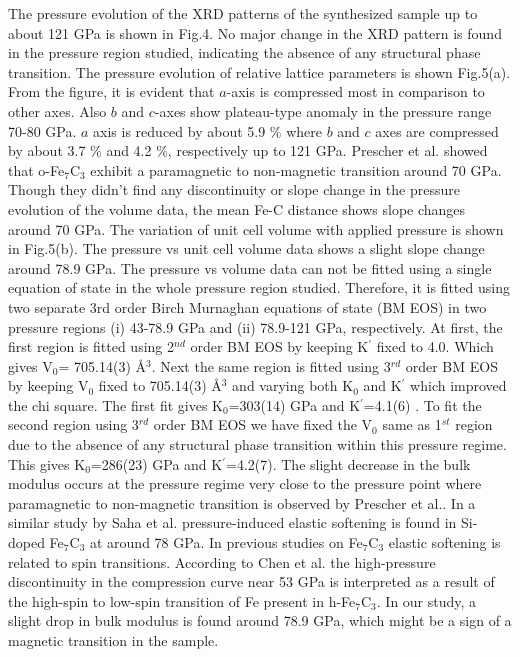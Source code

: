 \documentclass[prb,aps,preprint]{revtex4-2}
\begin{document}
The pressure evolution of the XRD patterns of the synthesized sample  up to about 121 GPa is shown in Fig.4. No major change in the XRD pattern is found in the pressure region studied, indicating the absence of any structural phase transition. 
The pressure evolution of relative lattice parameters is shown Fig.5(a).
From the figure, it is evident that $a$-axis is compressed most in comparison to other axes. Also $b$ and $c$-axes show plateau-type anomaly in the pressure range 70-80 GPa. $a$ axis is reduced by about 5.9 \% where $b$ and $c$ axes are compressed by about 3.7 \% and 4.2 \%, respectively up to 121 GPa. Prescher et al. \cite{prescher2015high} showed that o-Fe$_{7}$C$_{3}$ exhibit a paramagnetic to non-magnetic transition around 70 GPa. Though they didn't find any discontinuity or slope change in the pressure evolution of the volume data, the mean Fe-C distance shows slope changes around 70 GPa. The variation of unit cell volume with applied pressure is shown in Fig.5(b).
The pressure vs unit cell volume data shows a slight slope change around 78.9 GPa. The pressure vs volume data can not be fitted  using a single equation of state in the whole pressure region studied. Therefore, it is fitted using two separate 3rd order Birch Murnaghan equations of state (BM EOS) in two pressure regions (i) 43-78.9 GPa and (ii) 78.9-121 GPa, respectively. At first, the first region is fitted using 2$^{nd}$ order BM EOS by keeping K$^{'}$ fixed to 4.0. Which gives V$_{0}$= 705.14(3) \AA$^{3}$. Next the same region is fitted using 3$^{rd}$ order BM EOS by keeping V$_{0}$ fixed to 705.14(3) \AA$^{3}$ and varying both K$_{0}$ and K$^{'}$ which improved the chi square. The first fit gives K$_{0}$=303(14) GPa and K$^{'}$=4.1(6) .
To fit the second region using 3$^{rd}$ order BM EOS we have fixed the V$_{0}$ same as 1$^{st}$ region due to the absence of any structural phase transition within this pressure regime. This gives K$_{0}$=286(23) GPa and K$^{'}$=4.2(7). The slight decrease in the bulk modulus occurs at the pressure regime very close to the pressure point where paramagnetic to non-magnetic transition is observed by Prescher et al.\cite{prescher2015high}.  In a similar study by Saha et al. \cite{saha2021synthesis} pressure-induced elastic softening is found in Si-doped Fe$_{7}$C$_{3}$ at around 78 GPa. In previous studies on Fe$_{7}$C$_{3}$ elastic softening is related to spin transitions\cite{mookherjee2011high,nakajima2011thermoelastic}. According to Chen et al.\cite{chen2012magneto} the high-pressure discontinuity in the compression curve near 53 GPa is interpreted as a result of the high-spin to low-spin transition of Fe present in h-Fe$_{7}$C$_{3}$.
In our study, a slight drop in bulk modulus is found around 78.9 GPa, which might be a sign of a magnetic transition in the sample. 
\end{document}
